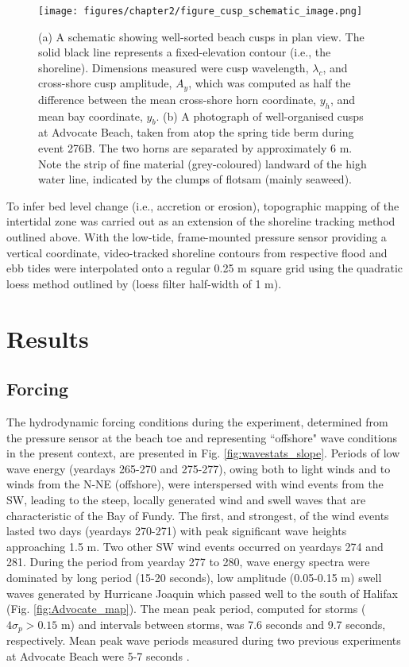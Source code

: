 \begin{figure}[tbp]
\begin{center}
 	\texttt{[image: figures/chapter2/figure\_cusp\_schematic\_image.png]}
	\caption[Beach cusp dimensional measures]{(a) A schematic showing well-sorted beach cusps in plan view. The solid black line represents a fixed-elevation contour (i.e., the shoreline). Dimensions measured were cusp wavelength, $\lambda_c$, and cross-shore cusp amplitude, $A_y$, which was computed as half the difference between the mean cross-shore horn coordinate, $y_h$, and mean bay coordinate, $y_b$. (b) A photograph of well-organised cusps at Advocate Beach, taken from atop the spring tide berm during event 276B. The two horns are separated by approximately 6 m. Note the strip of fine material (grey-coloured) landward of the high water line, indicated by the clumps of flotsam (mainly seaweed).}
	\label{fig:cusp_schematic}
\end{center}	
\end{figure}

To infer bed level change (i.e., accretion or erosion), topographic mapping of the intertidal zone was carried out as an extension of the shoreline tracking method outlined above. With the low-tide, frame-mounted pressure sensor providing a vertical coordinate, video-tracked shoreline contours from respective flood and ebb tides were interpolated onto a regular 0.25 m square grid using the quadratic loess method outlined by \citet{Plant_etal2002} (loess filter half-width of 1 m).   



\section{Results}\label{ch2:Results}

\subsection{Forcing}

The hydrodynamic forcing conditions during the experiment, determined from the pressure sensor at the beach toe and representing ``offshore" wave conditions in the present context, are presented in Fig. \ref{fig:wavestats_slope}. Periods of low wave energy (yeardays 265-270 and 275-277), owing both to light winds and to winds from the N-NE (offshore), were interspersed with wind events from the SW, leading to the steep, locally generated wind and swell waves that are characteristic of the Bay of Fundy. The first, and strongest, of the wind events lasted two days (yeardays 270-271) with peak significant wave heights approaching 1.5 m. Two other SW wind events occurred on yeardays 274 and 281. During the period from yearday 277 to 280, wave energy spectra were dominated by long period (15-20 seconds), low amplitude (0.05-0.15 m) swell waves generated by Hurricane Joaquin which passed well to the south of Halifax (Fig. \ref{fig:Advocate_map}). The mean peak period, computed for storms ($4\sigma_{p} > 0.15 $ m) and intervals between storms, was 7.6 seconds and 9.7 seconds, respectively. Mean peak wave periods measured during two previous experiments at Advocate Beach were 5-7 seconds \citep[e.g.,][]{Hay_etal2014}. 

